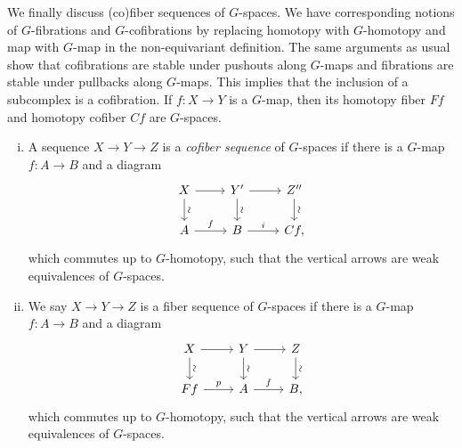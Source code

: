 We finally discuss (co)fiber sequences of $G$-spaces. We have corresponding
notions of $G$-fibrations and $G$-cofibrations by replacing
homotopy with $G$-homotopy and map with $G$-map in the non-equivariant definition.
The same arguments as usual show that cofibrations are stable under pushouts
along $G$-maps and fibrations are stable under pullbacks along $G$-maps.
This implies that the inclusion of a subcomplex is a cofibration.
If $f:X\to Y$ is a $G$-map, then its homotopy fiber $Ff$ and homotopy
cofiber $Cf$ are $G$-spaces.
\begin{mydef}
\begin{enumerate}[(i)]
\item A sequence $X\to Y\to Z$
is a \textit{cofiber sequence} of $G$-spaces
if there is a $G$-map $f:A\to B$
and a diagram
\[
\begin{tikzcd}
X\arrow{r}\arrow{d}[anchor = center, rotate = 90, yshift = -1ex]{\sim}
&Y' \arrow{d}[anchor = center, rotate = 90, yshift = -1ex]{\sim}\arrow{r}
&Z''\arrow{d}[anchor = center, rotate = 90, yshift = -1ex]{\sim}\\
A\arrow{r}{f}
&B\arrow{r}{i}
&Cf,
\end{tikzcd}
\]
which commutes up to $G$-homotopy, such that the vertical
arrows are weak equivalences of $G$-spaces.
\item We say $X\to Y\to Z$ is a fiber sequence of $G$-spaces
if there is a $G$-map $f:A\to B$
and a diagram
\[
\begin{tikzcd}
X\arrow{r}\arrow{d}[anchor = center, rotate = 90, yshift = -1ex]{\sim}
&Y \arrow{d}[anchor = center, rotate = 90, yshift = -1ex]{\sim}\arrow{r}
&Z\arrow{d}[anchor = center, rotate = 90, yshift = -1ex]{\sim}\\
Ff\arrow{r}{p}
&A\arrow{r}{f}
&B,
\end{tikzcd}
\]
which commutes up to $G$-homotopy, such that the vertical
arrows are weak equivalences of $G$-spaces.
\end{enumerate}
\end{mydef}



